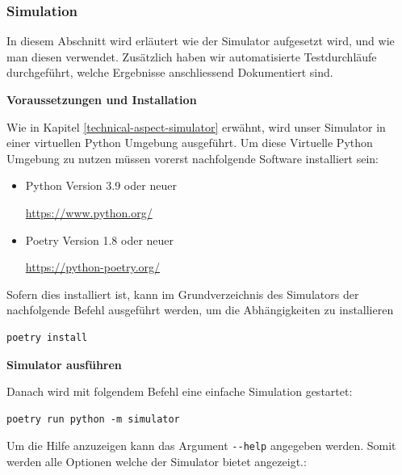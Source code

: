 \subsubsection{Simulation}

In diesem Abschnitt wird erläutert wie der Simulator aufgesetzt wird, und wie man diesen verwendet. Zusätzlich haben wir automatisierte Testdurchläufe durchgeführt, welche Ergebnisse anschliessend Dokumentiert sind.

\textbf{Voraussetzungen und Installation}

Wie in Kapitel \ref{technical-aspect-simulator} erwähnt, wird unser Simulator in einer virtuellen Python Umgebung ausgeführt. Um diese Virtuelle Python Umgebung zu nutzen müssen vorerst nachfolgende Software installiert sein:

\begin{itemize}
    \item Python Version 3.9 oder neuer
    
    \url{https://www.python.org/}
    \item Poetry Version 1.8 oder neuer
    
    \url{https://python-poetry.org/}
\end{itemize}

Sofern dies installiert ist, kann im Grundverzeichnis des Simulators der nachfolgende Befehl ausgeführt werden, um die Abhängigkeiten zu installieren

\begin{verbatim}
poetry install
\end{verbatim}

\textbf{Simulator ausführen}

Danach wird mit folgendem Befehl  eine einfache Simulation gestartet:

\begin{verbatim}
poetry run python -m simulator
\end{verbatim}

Um die Hilfe anzuzeigen kann das Argument \verb|--help| angegeben werden. Somit werden alle Optionen welche der Simulator bietet angezeigt.:


